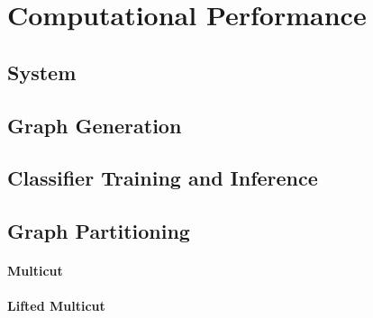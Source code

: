 \section{Computational Performance}

\subsection{System}

\subsection{Graph Generation}

\subsection{Classifier Training and Inference}

\subsection{Graph Partitioning}

\paragraph{Multicut}

\paragraph{Lifted Multicut}